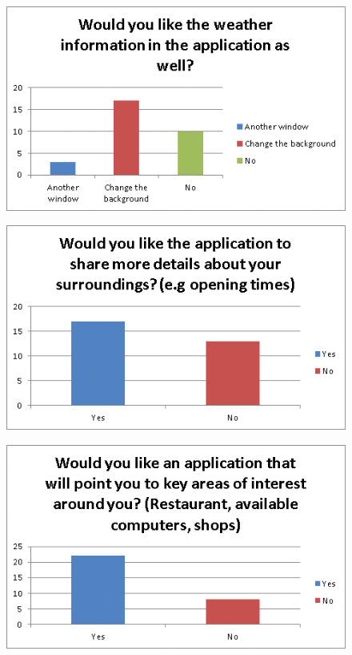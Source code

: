 \documentclass[10pt,oneside,notitlepage]{report}
\begin{document}
\begin{figure}[H]
 \centering
 \includegraphics[keepaspectratio]{10.png}
\end{figure}

\begin{figure}[H]
 \centering
 \includegraphics[keepaspectratio]{11.png}
\end{figure}

\begin{figure}[H]
 \centering
 \includegraphics[keepaspectratio]{12.png}
\end{figure}
\end{document}
